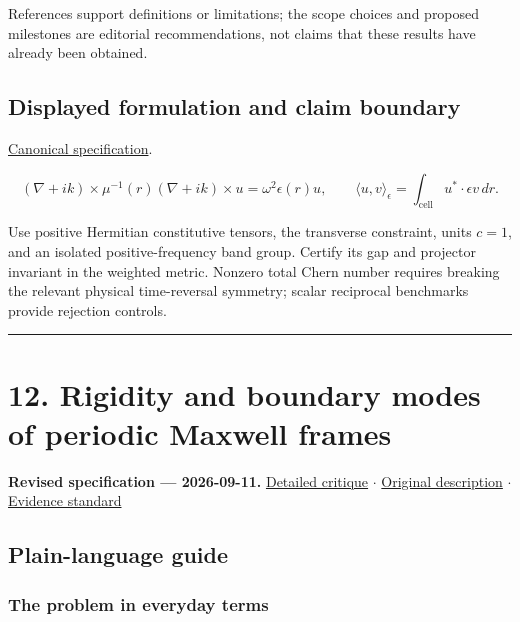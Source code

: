 \documentclass[
  11pt,
]{article}
\begin{document}
References support definitions or limitations; the scope choices and
proposed milestones are editorial recommendations, not claims that these
results have already been obtained.

\subsection{Displayed formulation and claim boundary}

\href{https://github.com/rick-stevens-ai/Pure-Thought/blob/main/PRDs/11-Photonic-Topological-Crystals.md}{Canonical
specification}.

\[(\nabla+ik)\times\mu^{-1}(r)(\nabla+ik)\times u
=\omega^2\epsilon(r)u,\qquad
\langle u,v\rangle_\epsilon=\int_{\mathrm{cell}}u^*\cdot\epsilon v\,dr.\]

Use positive Hermitian constitutive tensors, the transverse constraint,
units \(c=1\), and an isolated positive-frequency band group. Certify
its gap and projector invariant in the weighted metric. Nonzero total
Chern number requires breaking the relevant physical time-reversal
symmetry; scalar reciprocal benchmarks provide rejection controls.

\begin{center}\rule{0.5\linewidth}{0.5pt}\end{center}

\section{12. Rigidity and boundary modes of periodic Maxwell frames}

\textbf{Revised specification --- 2026-09-11.}
\href{https://github.com/rick-stevens-ai/Pure-Thought/blob/main/reviews/12-Topological-Mechanical-Metamaterials.md}{Detailed
critique} \ensuremath{\cdot}
\href{https://github.com/rick-stevens-ai/Pure-Thought/blob/main/archive/original-PRDs/12-Topological-Mechanical-Metamaterials.md}{Original
description} \ensuremath{\cdot}
\href{https://github.com/rick-stevens-ai/Pure-Thought/blob/main/reviews/EVIDENCE-STANDARD.md}{Evidence
standard}

\subsection{Plain-language guide}

\subsubsection{The problem in everyday terms}
\end{document}
